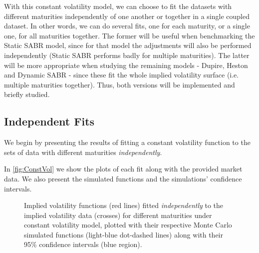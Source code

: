 With this constant volatility model, we can choose to fit the datasets with different maturities independently of one another or together in a single coupled dataset. In other words, we can do several fits, one for each maturity, or a single one, for all maturities together. The former will be useful when benchmarking the Static SABR model, since for that model the adjustments will also be performed independently (Static SABR performs badly for multiple maturities). The latter will be more appropriate when studying the remaining models - Dupire, Heston and Dynamic SABR - since these fit the whole implied volatility surface (i.e. multiple maturities together). Thus, both versions will be implemented and briefly studied.


\newpage
\subsection{Independent Fits}
We begin by presenting the results of fitting a constant volatility function to the sets of data with different maturities \emph{independently}.


In \autoref{fig:ConstVol} we show the plots of each fit along with the provided market data. We also present the simulated functions and the simulations' confidence intervals.
\begin{figure}[H]
  \begin{subfigmatrix}{2}
  \end{subfigmatrix}
  \caption[Implied volatility functions fitted independently to the implied volatility data for different maturities under constant volatility model, plotted with their respective Monte Carlo simulated functions along with their confidence intervals.]{Implied volatility functions (red lines) fitted \emph{independently} to the implied volatility data (crosses) for different maturities under constant volatility model, plotted with their respective Monte Carlo simulated functions (light-blue dot-dashed lines) along with their 95\% confidence intervals (blue region).}
  \label{fig:ConstVol}
\end{figure}

